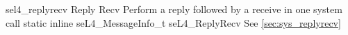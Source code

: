 %
%
%
%

\apidoc
{sel4_replyrecv}
{Reply Recv}
{Perform a reply followed by a receive in one system call}
{static inline seL4\_MessageInfo\_t seL4\_ReplyRecv}
{
}
{\messageinforetdesc}
{See \autoref{sec:sys_replyrecv}}
